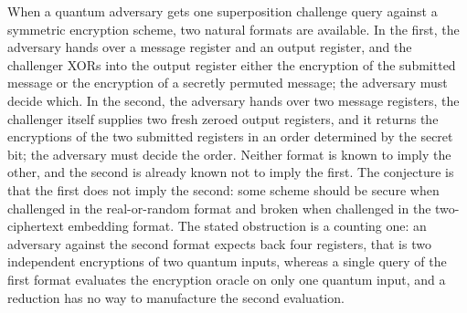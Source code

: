 \documentclass{aicr-conjecture}
\begin{document}

\vspace{0.4em}

\begin{informalconjecture}
When a quantum adversary gets one superposition challenge query against
a symmetric encryption scheme, two natural formats are available. In the
first, the adversary hands over a message register and an output
register, and the challenger XORs into the output register either the
encryption of the submitted message or the encryption of a secretly
permuted message; the adversary must decide which. In the second, the
adversary hands over two message registers, the challenger itself
supplies two fresh zeroed output registers, and it returns the
encryptions of the two submitted registers in an order determined by the
secret bit; the adversary must decide the order. Neither format is known
to imply the other, and the second is already known not to imply the
first. The conjecture is that the first does not imply the second: some
scheme should be secure when challenged in the real-or-random format and
broken when challenged in the two-ciphertext embedding format. The
stated obstruction is a counting one: an adversary against the second
format expects back four registers, that is two independent encryptions
of two quantum inputs, whereas a single query of the first format
evaluates the encryption oracle on only one quantum input, and a
reduction has no way to manufacture the second evaluation.
\end{informalconjecture}
\end{document}
